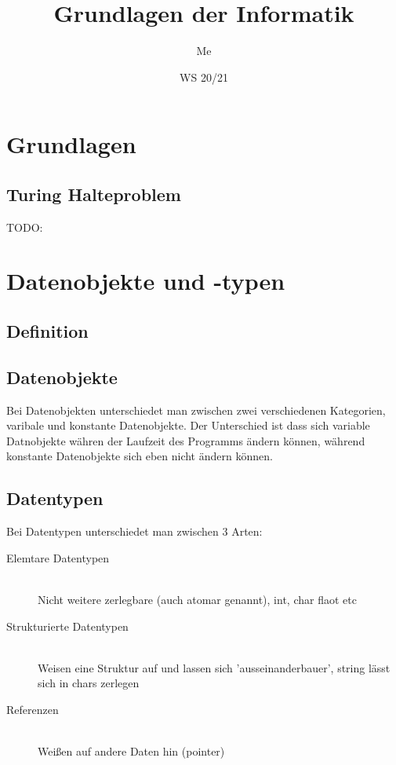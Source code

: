 \documentclass[a4paper]{scrartcl}
\author{Me}
\title{Grundlagen der Informatik}
\date{WS 20/21}
\begin{document}
    \maketitle
    \newpage
    \tableofcontents
    \newpage
    \section{Grundlagen}
        \subsection{Turing Halteproblem}
            TODO: 
    \section{Datenobjekte und -typen}
        \subsection{Definition}
        \subsection*{Datenobjekte}
            Bei Datenobjekten unterschiedet man zwischen zwei verschiedenen Kategorien, varibale und konstante Datenobjekte. Der Unterschied ist dass sich variable Datnobjekte währen der Laufzeit
            des Programms ändern können, während konstante Datenobjekte sich eben nicht ändern können.
        \subsection*{Datentypen}
            Bei Datentypen unterschiedet man zwischen 3 Arten: 
            \begin{description}
                \item[Elemtare Datentypen] \hfill \\
                    Nicht weitere zerlegbare (auch atomar genannt), int, char flaot etc
                \item[Strukturierte Datentypen] \hfill \\
                    Weisen eine Struktur auf und lassen sich 'ausseinanderbauer', string lässt sich in chars zerlegen
                \item[Referenzen] \hfill \\
                    Weißen auf andere Daten hin (pointer)  
            \end{description}
        
\end{document}
